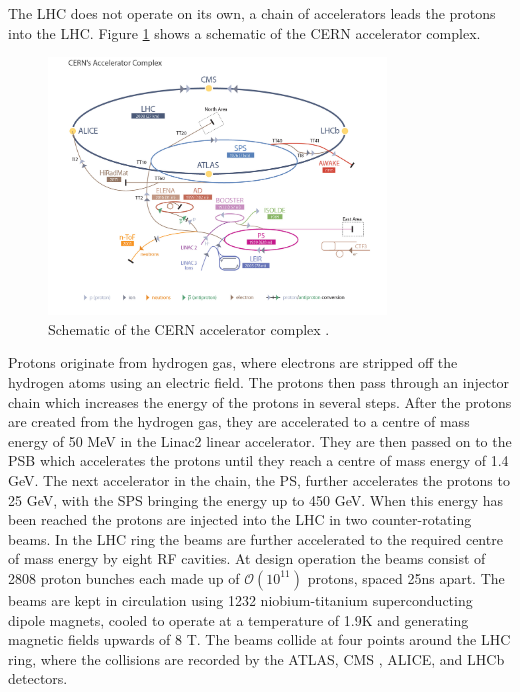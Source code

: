 The \ac{LHC} does not operate on its own, a chain of accelerators leads
the protons into the \ac{LHC}. Figure \ref{fig:lhc_schematic} shows a schematic
of the \ac{CERN} accelerator complex.
\begin{figure}[h!]
\includegraphics[width=0.8\textwidth]{./Detector/Plots/LHC_default.jpg}
\caption{Schematic of the \ac{CERN} accelerator complex \cite{lhc-schematic}.}
\label{fig:lhc_schematic}
\end{figure}
Protons originate from hydrogen gas, where electrons are stripped off the 
hydrogen atoms using an electric field. The protons then pass through an injector
chain which increases the energy of the protons in several steps. After the protons
are created from the hydrogen gas, they are accelerated to a centre of mass energy of
50 MeV in the Linac2 linear accelerator. They are then passed on to the
\acf{PSB} which accelerates the protons until they reach a centre of mass energy of 1.4 GeV.
The next accelerator in the chain, the \acf{PS}, further accelerates the protons to 25 GeV,
with the \acf{SPS} bringing the energy up to 450 GeV. When this energy has been 
reached the protons are injected into the \ac{LHC} in two counter-rotating
beams. In the \ac{LHC} ring the beams are further accelerated to the required centre of mass energy
by eight \ac{RF} cavities. At design operation the beams consist of 2808 proton bunches each made up 
of $\mathcal{O}(10^11)$ protons, spaced 25ns apart. The beams are kept in circulation
using 1232 niobium-titanium superconducting dipole magnets, cooled to operate at 
a temperature of 1.9K and generating magnetic fields upwards of 8 T.
The beams collide at four points
around the \ac{LHC} ring, where the collisions are recorded by the ATLAS\cite{atlas-jinst}, 
CMS%
, ALICE\cite{alice-jinst}, and LHCb\cite{lhcb-jinst} detectors.

